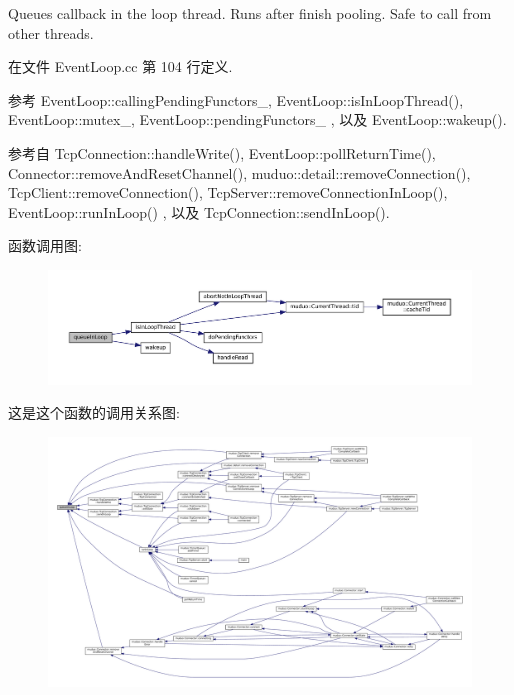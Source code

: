 Queues callback in the loop thread. Runs after finish pooling. Safe to call from other threads. 

在文件 Event\+Loop.\+cc 第 104 行定义.



参考 Event\+Loop\+::calling\+Pending\+Functors\+\_\+, Event\+Loop\+::is\+In\+Loop\+Thread(), Event\+Loop\+::mutex\+\_\+, Event\+Loop\+::pending\+Functors\+\_\+ , 以及 Event\+Loop\+::wakeup().



参考自 Tcp\+Connection\+::handle\+Write(), Event\+Loop\+::poll\+Return\+Time(), Connector\+::remove\+And\+Reset\+Channel(), muduo\+::detail\+::remove\+Connection(), Tcp\+Client\+::remove\+Connection(), Tcp\+Server\+::remove\+Connection\+In\+Loop(), Event\+Loop\+::run\+In\+Loop() , 以及 Tcp\+Connection\+::send\+In\+Loop().

函数调用图\+:
\nopagebreak
\begin{figure}[H]
\begin{center}
\leavevmode
\includegraphics[width=350pt]{classmuduo_1_1EventLoop_a7d2b6939f8f94715d253c0d4c6cee207_cgraph}
\end{center}
\end{figure}
这是这个函数的调用关系图\+:
\nopagebreak
\begin{figure}[H]
\begin{center}
\leavevmode
\includegraphics[width=350pt]{classmuduo_1_1EventLoop_a7d2b6939f8f94715d253c0d4c6cee207_icgraph}
\end{center}
\end{figure}
\mbox{\label{classmuduo_1_1EventLoop_a2463a3acef2df4c951ce942a3229e44e}} 
